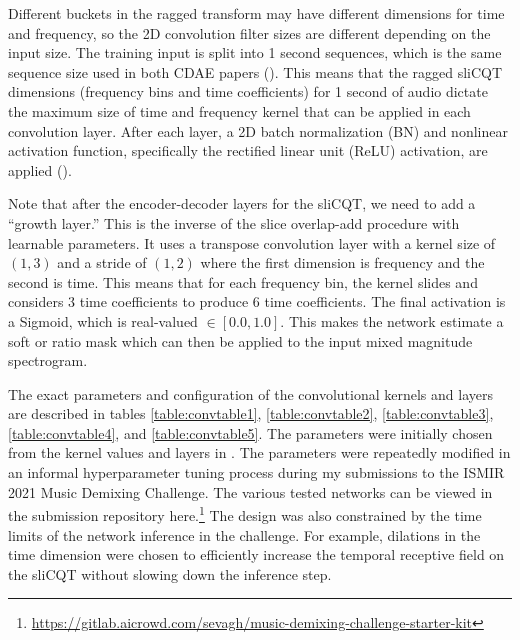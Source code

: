 \documentclass[report.tex]{subfiles}
\begin{document}
Different buckets in the ragged transform may have different dimensions for time and frequency, so the 2D convolution filter sizes are different depending on the input size. The training input is split into 1 second sequences, which is the same sequence size used in both CDAE papers (\cite{plumbley1, plumbley2}). This means that the ragged sliCQT dimensions (frequency bins and time coefficients) for 1 second of audio dictate the maximum size of time and frequency kernel that can be applied in each convolution layer. After each layer, a 2D batch normalization (BN) and nonlinear activation function, specifically the rectified linear unit (ReLU) activation, are applied (\cite{plumbley2}).

Note that after the encoder-decoder layers for the sliCQT, we need to add a ``growth layer.'' This is the inverse of the slice overlap-add procedure with learnable parameters. It uses a transpose convolution layer with a kernel size of $(1, 3)$ and a stride of $(1, 2)$ where the first dimension is frequency and the second is time. This means that for each frequency bin, the kernel slides and considers 3 time coefficients to produce 6 time coefficients. The final activation is a Sigmoid, which is real-valued $\in [0.0, 1.0]$. This makes the network estimate a soft or ratio mask which can then be applied to the input mixed magnitude spectrogram.

The exact parameters and configuration of the convolutional kernels and layers are described in tables \ref{table:convtable1}, \ref{table:convtable2}, \ref{table:convtable3}, \ref{table:convtable4}, and \ref{table:convtable5}. The parameters were initially chosen from the kernel values and layers in \textcite{plumbley1, plumbley2}. The parameters were repeatedly modified in an informal hyperparameter tuning process during my submissions to the ISMIR 2021 Music Demixing Challenge. The various tested networks can be viewed in the submission repository here.\footnote{\url{https://gitlab.aicrowd.com/sevagh/music-demixing-challenge-starter-kit}} The design was also constrained by the time limits of the network inference in the challenge. For example, dilations in the time dimension were chosen to efficiently increase the temporal receptive field on the sliCQT without slowing down the inference step.
\end{document}
